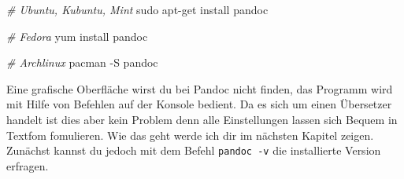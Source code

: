 \documentclass[
    12pt,
    a4paper,
            ngerman,
        bibliography=totocnumbered,
    listof=totocnumbered
]{scrartcl}
\newenvironment{Shaded}{}{}
\newcommand{\CommentTok}[1]{\textcolor[rgb]{0.38,0.63,0.69}{\textit{#1}}}
\newcommand{\ExtensionTok}[1]{#1}
\newcommand{\FunctionTok}[1]{\textcolor[rgb]{0.02,0.16,0.49}{#1}}
\newcommand{\NormalTok}[1]{#1}
\begin{document}
\begin{Shaded}
\begin{Highlighting}[]
\CommentTok{\# Ubuntu, Kubuntu, Mint}
\FunctionTok{sudo}\NormalTok{ apt{-}get install pandoc}

\CommentTok{\# Fedora}
\ExtensionTok{yum}\NormalTok{ install pandoc}

\CommentTok{\# Archlinux}
\ExtensionTok{pacman}\NormalTok{ {-}S pandoc}
\end{Highlighting}
\end{Shaded}

Eine grafische Oberfläche wirst du bei Pandoc nicht finden, das Programm
wird mit Hilfe von Befehlen auf der Konsole bedient. Da es sich um einen
Übersetzer handelt ist dies aber kein Problem denn alle Einstellungen
lassen sich Bequem in Textfom fomulieren. Wie das geht werde ich dir im
nächsten Kapitel zeigen. Zunächst kannst du jedoch mit dem Befehl
\texttt{pandoc\ -v} die installierte Version erfragen.
\end{document}
